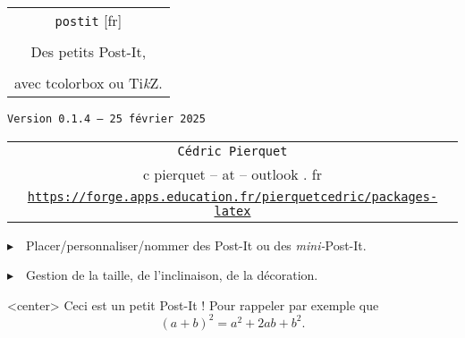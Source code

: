 \documentclass[french,a4paper,11pt]{article}
\def\TPversion{0.1.4}
\def\TPdate{25 février 2025}
\begin{document}
\setlength{\aweboxleftmargin}{0.07\linewidth}
\setlength{\aweboxcontentwidth}{0.93\linewidth}
\setlength{\aweboxvskip}{8pt}

\pagestyle{fancy}

\thispagestyle{empty}

\vspace{2cm}

\begin{center}
	\begin{minipage}{0.75\linewidth}
	\begin{tcolorbox}[colframe=yellow,colback=yellow!15]
		\begin{center}
			\begin{tabular}{c}
				{\Huge \texttt{postit} [fr]}\\
				\\
				{\LARGE Des petits Post-It,} \\
				\\
				{\LARGE avec \textsf{tcolorbox} ou \textsf{Ti\textit{k}Z}.} \\
			\end{tabular}
			
			\bigskip
			
			{\small \texttt{Version \TPversion{} -- \TPdate}}
		\end{center}
	\end{tcolorbox}
\end{minipage}
\end{center}

\begin{center}
	\begin{tabular}{c}
	\texttt{Cédric Pierquet}\\
	{\ttfamily c pierquet -- at -- outlook . fr}\\
	\texttt{\url{https://forge.apps.education.fr/pierquetcedric/packages-latex}}
\end{tabular}
\end{center}

\vspace{0.25cm}

{$\blacktriangleright$~~Placer/personnaliser/nommer des Post-It ou des \textit{mini-}Post-It.}

\vspace{0.25cm}

{$\blacktriangleright$~~Gestion de la taille, de l'inclinaison, de la décoration.}

\vspace{1cm}

\begin{PostIt}[RappelPostIt=PI1]<center>
	Ceci est un petit Post-It ! Pour rappeler par exemple que \[(a+b)^2=a^2+2ab+b^2.\]
\end{PostIt}
\end{document}
